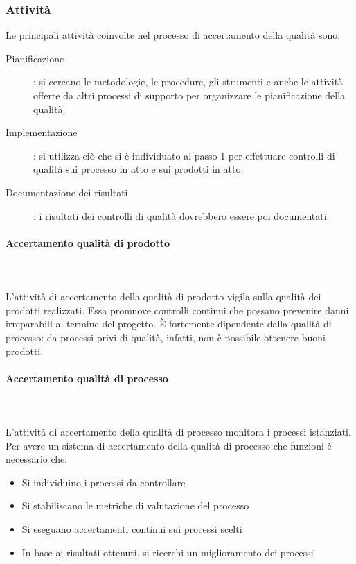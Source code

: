 \documentclass[../norme-di-progetto.tex]{subfiles}
\begin{document}
\subsubsection{Attività}
\label{subs:attivita}
Le principali attività coinvolte nel processo di accertamento della qualità sono:
\begin{description}
  \item [Pianificazione]: si cercano le metodologie, le procedure, gli strumenti e anche le attività offerte da altri processi di supporto per organizzare le pianificazione della qualità.
  \item [Implementazione]: si utilizza ciò che si è individuato al passo 1 per effettuare controlli di qualità sui processo in atto e sui prodotti in atto.
  \item [Documentazione dei risultati]: i risultati dei controlli di qualità dovrebbero essere poi documentati.
\end{description}
\paragraph{Accertamento qualità di prodotto}\mbox{}\\
\label{par:accertamento qualita di prodotto}
\\L'attività di accertamento della qualità di prodotto vigila sulla qualità dei prodotti realizzati. Essa promuove controlli continui che possano prevenire danni irreparabili al termine del progetto. È fortemente dipendente dalla qualità di processo: da processi privi di qualità, infatti, non è possibile ottenere buoni prodotti.
\paragraph{Accertamento qualità di processo}\mbox{}\\
\label{par:accertamento qualita di processo}
\\L'attività di accertamento della qualità di processo monitora i processi istanziati. Per avere un sistema di accertamento della qualità di processo che funzioni è necessario che:

\begin{itemize}
  \item Si individuino i processi da controllare
  \item Si stabiliscano le metriche di valutazione del processo
  \item Si eseguano accertamenti continui sui processi scelti
  \item In base ai risultati ottenuti, si ricerchi un miglioramento dei processi
\end{itemize}
\end{document}
